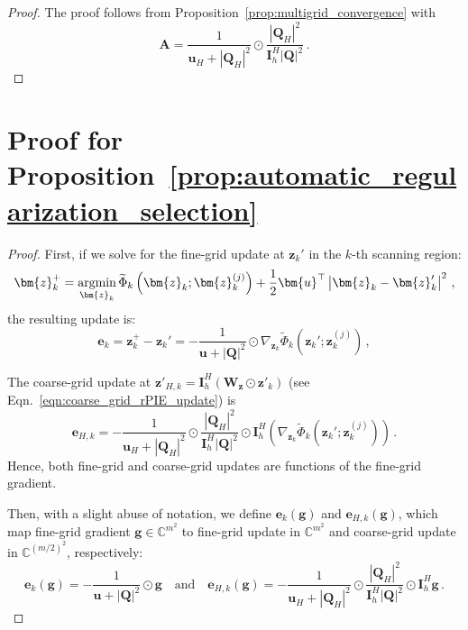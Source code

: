 \documentclass{article}
\numberwithin{equation}{section}
\begin{document}
\begin{proof}
     The proof follows from  Proposition~\ref{prop:multigrid_convergence} with
    \begin{equation*}
            \bm{A} = \frac{1}{\bm{u}_H+|\bm{Q}_H|^2}\odot\frac{|\bm{Q}_H|^2}{\bm{I}_h^H|\bm{Q}|^2}\,.     
    \end{equation*}
    \end{proof}

\section{Proof for Proposition~\ref{prop:automatic_regularization_selection}}\label{app:proof_automatic_regularization_selection}

\begin{proof}
First, if we solve for the fine-grid update at $\bm{z}_k'$ in the $k$-th scanning region:
\begin{equation*}
    \bm{z}_k^+=\operatornamewithlimits{argmin}_{\bm{z}_k}\widetilde{\Phi}_k\left(\bm{z}_k; \bm{z}_k^{(j)}\right)+\frac{1}{2}\bm{u}^\top\left|\bm{z}_k-\bm{z}_k'\right|^2\,,
\end{equation*}
the resulting update is:
\begin{equation*}
    \bm{e}_k = \bm{z}_k^+-\bm{z}_k' = -\frac{1}{\bm{u}+|\bm{Q}|^2}\odot\nabla_{\bm{z}_k}\widetilde{\Phi}_k\left(\bm{z}_k'; \bm{z}_k^{(j)}\right)\,,
\end{equation*}

The coarse-grid update at $\bm{z}'_{H,k}= \bm I_h^H(\bm{W}_{\bm{z}}\odot\bm{z}'_k)$ (see Eqn.~\ref{eqn:coarse_grid_rPIE_update}) is 
\begin{equation*}
    \bm{e}_{H,k} = -\frac{1}{\bm{u}_H+|\bm{Q}_H|^2}\odot\frac{|\bm{Q}_H|^2}{\bm{I}_h^H|\bm{Q}|^2}\odot\bm{I}_h^H\left(\nabla_{\bm{z}_k}\widetilde{\Phi}_k\left(\bm{z}_k'; \bm{z}_k^{(j)}\right)\right)\,.
\end{equation*}
Hence, both fine-grid and coarse-grid updates are functions of the fine-grid gradient.

Then, with a slight abuse of notation, we define 
$\bm{e}_k(\bm{g})$ and $\bm{e}_{H,k}(\bm{g})$, which map fine-grid gradient $\bm{g}\in\mathbb{C}^{m^2}$ to fine-grid update in $\mathbb{C}^{m^2}$ and coarse-grid update in $\mathbb{C}^{(m/2)^2}$, respectively:
\begin{equation*}
    \bm{e}_k(\bm{g}) = -\frac{1}{\bm{u}+|\bm{Q}|^2}\odot\bm{g}\quad\text{and}\quad\bm{e}_{H,k}(\bm{g})=-\frac{1}{\bm{u}_H+|\bm{Q}_H|^2}\odot\frac{|\bm{Q}_H|^2}{\bm{I}_h^H|\bm{Q}|^2}\odot\bm{I}_h^H\bm{g}
    \,.
\end{equation*}


\end{proof}
\end{document}
